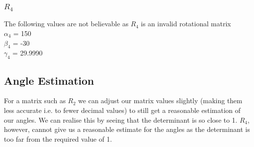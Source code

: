 		\subsubsection{$R_{4}$}
		The following values are not believable as $R_{4}$ is an invalid rotational matrix\\
			$\alpha_{4}$ = 150\degree\\
			$\beta_{4}$ = -30\degree\\
			$\gamma_{4}$ = 29.9990\degree\\
	\subsection{Angle Estimation}
	For a matrix such as $R_{2}$ we can adjust our matrix values slightly (making them less accurate i.e. to fewer decimal values) to still get a reasonable estimation of our angles. We can realise this by seeing that the determinant is so close to 1.
	$R_{4}$, however, cannot give us a reasonable estimate for the angles as the determinant is too far from the required value of 1.
